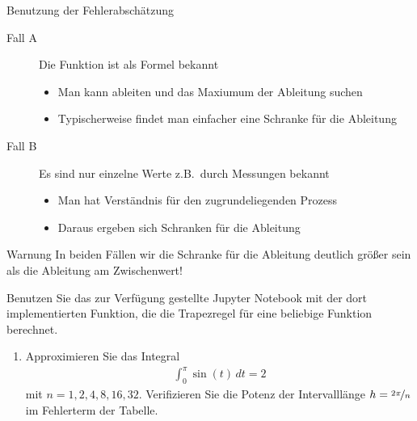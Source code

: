 \begin{frame}{Benutzung der Fehlerabschätzung}
  
  \begin{description}
  \item[Fall A] Die Funktion ist als \glqq{}Formel\grqq{} bekannt
    \begin{itemize}
    \item Man kann ableiten und das Maxiumum der Ableitung suchen
    \item Typischerweise findet man einfacher eine Schranke für die Ableitung
    \end{itemize}
  \item[Fall B] Es sind nur einzelne Werte z.B.\ durch Messungen bekannt
    \begin{itemize}
    \item Man hat Verständnis für den zugrundeliegenden Prozess
    \item Daraus ergeben sich Schranken für die Ableitung
    \end{itemize}
  \end{description}
  \pause
  \begin{block}{Warnung}
    In beiden Fällen wir die Schranke für die Ableitung deutlich größer sein als die Ableitung am Zwischenwert!
  \end{block}
\end{frame}

\begin{Aufgabe}
  Benutzen Sie das zur Verfügung gestellte Jupyter Notebook mit der
  dort implementierten Funktion, die die Trapezregel für eine
  beliebige Funktion berechnet.
    \begin{enumerate}
    \item Approximieren Sie das Integral
    \begin{gather*}
        \int_0^{\pi} \sin(t)\,dt = 2
    \end{gather*}
    mit $n=1,2,4,8,16,32$. Verifizieren Sie die Potenz der Intervalllänge $h=\nicefrac{2\pi}n$ im Fehlerterm der Tabelle.
    \end{enumerate}
  \end{Aufgabe}

